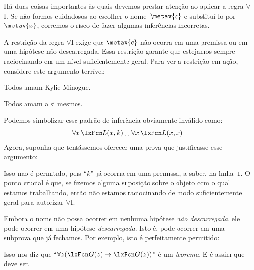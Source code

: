 Há duas coisas importantes às quais devemos prestar atenção ao aplicar a
regra $\forall$I. Se não formos cuidadosos ao escolher o
nome~$\metav{c}$ e substituí-lo por~$\metav{x}$, corremos o risco de
fazer algumas inferências incorretas.

A restrição da regra $\forall$I exige que $\metav{c}$ não
ocorra em uma premissa ou em uma hipótese não descarregada. Essa restrição
garante que estejamos sempre raciocinando em um nível suficientemente geral.
Para ver a restrição em ação, considere este argumento terrível:
	\begin{earg}
\item Todos amam Kylie Minogue.
\item[\texttherefore] Todos amam a si mesmos.
	\end{earg}
Podemos simbolizar esse padrão de inferência obviamente inválido como:
$$\forall x\,\atom{L}{x,k} \therefore \forall x\,\atom{L}{x,x}$$
Agora, suponha que tentássemos oferecer uma prova que justificasse esse argumento:
\begin{fitchproof}
	\PR
	 
	 
\end{fitchproof}
Isso não é permitido, pois \textquotedblleft $k$\textquotedblright{} já ocorria em uma premissa, a saber, na linha~$1$. O ponto crucial é que, se fizemos alguma suposição sobre o objeto com o qual estamos trabalhando, então não estamos raciocinando de modo suficientemente geral para autorizar $\forall$I.

Embora o nome não possa ocorrer em nenhuma hipótese \emph{não descarregada}, ele pode ocorrer em uma hipótese \emph{descarregada}. Isto é, pode ocorrer em uma subprova que já fechamos. Por exemplo, isto é perfeitamente permitido:
\begin{fitchproof}
	\open
		\AS
	\close
\end{fitchproof}
Isso nos diz que \textquotedblleft $\forall z(\atom{G}{z} \eif \atom{G}{z})$\textquotedblright{} é um \emph{teorema}. E é assim que deve ser.

